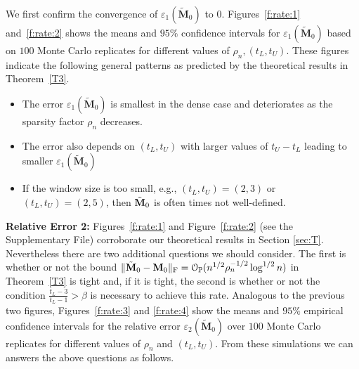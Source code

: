 \documentclass[10pt,journal,compsoc]{IEEEtran}
\newcommand{\op}{\mathcal{O}_{\mathbb{P}}}
\newcommand{\M}[1]{{{\mathbf{\MakeUppercase{#1}}}}}
\newcommand{\F}{\mathrm{F}}
\numberwithin{equation}{section}
\begin{document}
 We first confirm the convergence of $\varepsilon_1(\tilde{\mathbf{M}}_0)$ to $0$. Figures~\ref{f:rate:1} and~\ref{f:rate:2}
shows the means and $95\%$ confidence intervals for $\varepsilon_1(\tilde{\mathbf{M}}_0)$
based on $100$
Monte Carlo replicates for different values of $\rho_n, (t_L, t_U)$.
These figures indicate the following
general patterns as predicted by the theoretical results in Theorem~\ref{T3}.
\begin{itemize}
\item The error $\varepsilon_1(\tilde{\mathbf{M}}_0)$ is smallest in the dense case and deteriorates as the sparsity factor $\rho_n$ decreases.
\item The error also depends on $(t_L, t_U)$ with larger values of $t_U - t_L$ leading to smaller $\varepsilon_1(\tilde{\mathbf{M}}_0)$ 
\item %
  If the window size
  is too small, e.g., $(t_L, t_U) = (2,3)$ or $(t_L, t_U) = (2,5)$, then
  $\tilde{\M M}_0$ is often times not well-defined.
\end{itemize}
{\bf Relative Error 2:} Figures~\ref{f:rate:1} and Figure~\ref{f:rate:2} (see the Supplementary File)
corroborate our theoretical results in Section
\ref{sec:T}. Nevertheless there are two additional questions we
should consider. The first is whether or not the bound
$\|\tilde{\mathbf{M}}_0 - \M M_0\|_\F =
\op(n^{1/2}\rho_n^{-1/2}\log^{1/2}{n})$ in Theorem~\ref{T3} is
tight and, if it is tight, the second  is whether or not the
condition $\tfrac{t_L -
3}{t_L - 1} > \beta$ is necessary to achieve this rate.
Analogous to the previous two figures, Figures~\ref{f:rate:3} and
\ref{f:rate:4} show the means and $95\%$ empirical confidence intervals for
the relative error $\varepsilon_2(\tilde{\mathbf{M}}_0)$ over $100$
Monte Carlo replicates for different values of $\rho_n$ and $(t_L, t_U)$. 
From these simulations we can answers the above questions as follows. 
\end{document}
